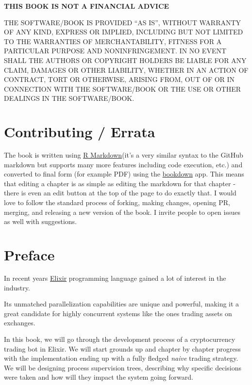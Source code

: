 \documentclass[
]{book}
\begin{document}
\textbf{THIS BOOK IS NOT A FINANCIAL ADVICE}

THE SOFTWARE/BOOK IS PROVIDED ``AS IS'', WITHOUT WARRANTY OF ANY KIND, EXPRESS OR IMPLIED, INCLUDING BUT NOT LIMITED TO THE WARRANTIES OF MERCHANTABILITY, FITNESS FOR A PARTICULAR PURPOSE AND NONINFRINGEMENT. IN NO EVENT SHALL THE AUTHORS OR COPYRIGHT HOLDERS BE LIABLE FOR ANY CLAIM, DAMAGES OR OTHER LIABILITY, WHETHER IN AN ACTION OF CONTRACT, TORT OR OTHERWISE, ARISING FROM, OUT OF OR IN CONNECTION WITH THE SOFTWARE/BOOK OR THE USE OR OTHER DEALINGS IN THE SOFTWARE/BOOK.

\hypertarget{contributing-errata}{%
\section*{Contributing / Errata}\label{contributing-errata}}

The book is written using \href{http://rmarkdown.rstudio.com/}{R Markdown}(it's a very similar syntax to the GitHub markdown but supports many more features including code execution, etc.) and converted to final form (for example PDF) using the \href{https://www.bookdown.org/}{bookdown} app. This means that editing a chapter is as simple as editing the markdown for that chapter - there is even an edit button at the top of the page to do exactly that. I would love to follow the standard process of forking, making changes, opening PR, merging, and releasing a new version of the book. I invite people to open issues as well with suggestions.

\hypertarget{preface}{%
\section*{Preface}\label{preface}}

In recent years \href{https://elixir-lang.org/}{Elixir} programming language gained a lot of interest in the industry.

Its unmatched parallelization capabilities are unique and powerful, making it a great candidate for highly concurrent systems like the ones trading assets on exchanges.

In this book, we will go through the development process of a cryptocurrency trading bot in Elixir. We will start grounds up and chapter by chapter progress with the implementation ending up with a fully fledged \emph{naive} trading strategy. We will be designing process supervision trees, describing why specific decisions were taken and how will they impact the system going forward.
\end{document}
